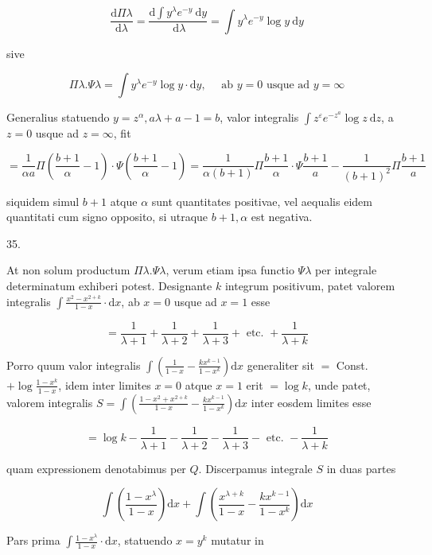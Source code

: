 \documentclass[10pt]{article}
\begin{document}
\[
\frac{\mathrm{d} \Pi \lambda}{\mathrm{d} \lambda}=\frac{\mathrm{d} \int y^{\lambda} e^{-y} \mathrm{~d} y}{\mathrm{~d} \lambda}=\int y^{\lambda} e^{-y} \log y \mathrm{~d} y
\]

sive

\[
\Pi \lambda . \Psi \lambda=\int y^{\lambda} e^{-y} \log y \cdot \mathrm{d} y, \quad \text { ab } y=0 \text { usque ad } y=\infty
\]

Generalius statuendo \(y=z^{\alpha}, a \lambda+a-1=b\), valor integralis \(\int z^{\varepsilon} e^{-z^{a}} \log z \mathrm{~d} z\), a \(z=0\) usque ad \(z=\infty\), fit

\[
=\frac{1}{\alpha a} \Pi\left(\frac{b+1}{\alpha}-1\right) \cdot \Psi\left(\frac{b+1}{\alpha}-1\right)=\frac{1}{\alpha(b+1)} \Pi \frac{b+1}{\alpha} \cdot \Psi \frac{b+1}{a}-\frac{1}{(b+1)^{2}} \Pi \frac{b+1}{a}
\]

siquidem simul \(b+1\) atque \(\alpha\) sunt quantitates positivae, vel aequalis eidem quantitati cum signo opposito, si utraque \(b+1, \alpha\) est negativa.

35.

At non solum productum \(\Pi \lambda . \Psi \lambda\), verum etiam ipsa functio \(\Psi \lambda\) per integrale determinatum exhiberi potest. Designante \(k\) integrum positivum, patet valorem integralis \(\int \frac{x^{2}-x^{2+k}}{1-x} \cdot \mathrm{d} x\), ab \(x=0\) usque ad \(x=1\) esse

\[
=\frac{1}{\lambda+1}+\frac{1}{\lambda+2}+\frac{1}{\lambda+3}+\text { etc. }+\frac{1}{\lambda+k}
\]

Porro quum valor integralis \(\int\left(\frac{1}{1-x}-\frac{k x^{k-1}}{1-x^{k}}\right) \mathrm{d} x\) generaliter sit \(=\) Const. \(+\log \frac{1-x^{k}}{1-x}\), idem inter limites \(x=0\) atque \(x=1\) erit \(=\log k\), unde patet, valorem integralis \(S=\int\left(\frac{1-x^{2}+x^{2+k}}{1-x}-\frac{k x^{k-1}}{1-x^{k}}\right) \mathrm{d} x\) inter eosdem limites esse

\[
=\log k-\frac{1}{\lambda+1}-\frac{1}{\lambda+2}-\frac{1}{\lambda+3}-\text { etc. }-\frac{1}{\lambda+k}
\]

quam expressionem denotabimus per \(Q\). Discerpamus integrale \(S\) in duas partes

\[
\int\left(\frac{1-x^{\lambda}}{1-x}\right) \mathrm{d} x+\int\left(\frac{x^{\lambda+k}}{1-x}-\frac{k x^{k-1}}{1-x^{k}}\right) \mathrm{d} x
\]

Pars prima \(\int \frac{1-x^{\lambda}}{1-x} \cdot \mathrm{d} x\), statuendo \(x=y^{k}\) mutatur in
\end{document}
